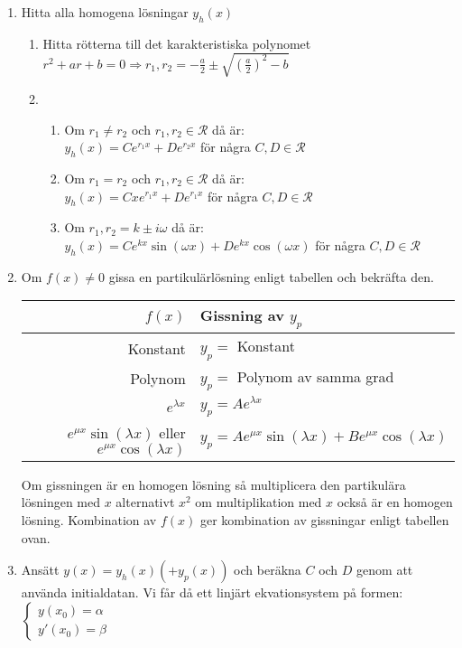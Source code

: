 \documentclass{article}
\begin{document}
\begin{enumerate}
   \item Hitta alla homogena lösningar $y_{h}(x)$
   \begin{enumerate}
      \item Hitta rötterna till det karakteristiska polynomet\\
      $r^2+ar+b=0\Rightarrow r_{1},r_{2}=-\frac{a}{2}\pm \sqrt{(\frac{a}{2})^2-b}$
      \item
      \begin{enumerate}
         \item Om $r_{1}\neq r_{2}$ och $r_{1},r_{2}\in\mathcal{R}$ då är:\\
         $y_{h}(x)=Ce^{r_{1}x}+De^{r_{2}x}$ för några $C,D\in\mathcal{R}$
         \item Om $r_{1}=r_{2}$ och $r_{1},r_{2}\in\mathcal{R}$ då är:\\
         $y_{h}(x)=Cxe^{r_{1}x}+De^{r_{1}x}$ för några $C,D\in\mathcal{R}$
         \item Om $r_{1},r_{2}=k\pm i\omega$ då är:\\
         $y_{h}(x)=Ce^{kx}\sin(\omega x)+De^{kx}\cos(\omega x)$ för några $C,D\in\mathcal{R}$
      \end{enumerate}
   \end{enumerate}
   \item Om $f(x)\neq 0$ gissa en partikulärlösning enligt tabellen och bekräfta den.
   \begin{table}[!h]
   \centering
   \begin{tabular}{|r|l|}
   \hline
   $f(x)$                            & Gissning av $y_{p}$                                         \\ \hline
   Konstant                          & $y_{p}=$ Konstant                                            \\ \hline
   Polynom                           & $y_{p}=$ Polynom av samma grad                               \\ \hline
   $e^{\lambda x}$                   & $y_{p}=Ae^{\lambda x}$                                      \\ \hline
   $e^{\mu x}\sin(\lambda x)$ eller $e^{\mu x}\cos(\lambda x)$        & $y_{p}=Ae^{\mu x}\sin(\lambda x)+Be^{\mu x}\cos(\lambda x)$ \\ \hline
   \end{tabular}
   \end{table}

   Om gissningen är en homogen lösning så multiplicera den partikulära lösningen med $x$ alternativt $x^2$ om multiplikation med $x$ också är en homogen lösning. Kombination av $f(x)$ ger kombination av gissningar enligt tabellen ovan.
   \item Ansätt $y(x)=y_{h}(x)(+y_{p}(x))$ och beräkna $C$ och $D$ genom att använda initialdatan. Vi får då ett linjärt ekvationsystem på formen:\\
   $\left\{
   \begin{array}{l}
       y(x_{0})=\alpha \\
       y'(x_{0})=\beta
   \end{array}
   \right.$
\end{enumerate}
\end{document}
